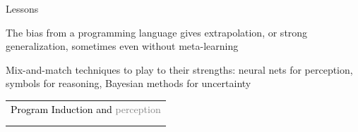 \documentclass{beamer}
\begin{document}
\begin{frame}{Lessons}

  The bias from a programming language gives extrapolation, or strong generalization, sometimes even without meta-learning

  \vspace{1cm}
  
  Mix-and-match techniques to play to their strengths: neural nets for perception, symbols for reasoning, Bayesian methods for uncertainty

\end{frame}

\begin{frame}{}
  \begin{center}
    \begin{tabular}{l}
      {\textcolor{black}{Program Induction and }\textcolor{gray}{perception}}\\
      \phantom{Program Induction and }{\textcolor{black}{learning to learn}}\\
      \phantom{Program Induction and }{\textcolor{gray}{discovering models}}
      \end{tabular}
  \end{center}
\end{frame}
\end{document}
